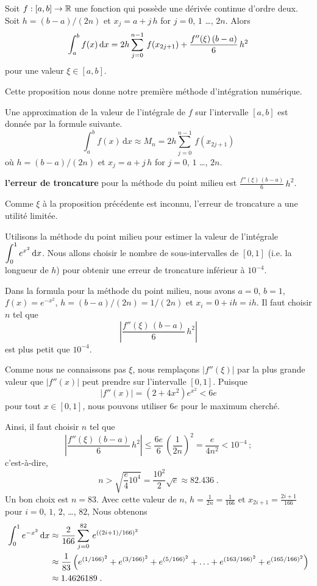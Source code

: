 {\begin{prop}
Soit $f:[a,b]\rightarrow \mathbb{R}$ une fonction qui possède une dérivée
continue d'ordre deux.  Soit $h=(b-a)/(2n)$ et $x_j = a+j\,h$ for
$j=0$, $1$ \ldots, $2n$.  Alors
\[
\int_{a}^{b} f(x)\,\mathrm{d}x = 2h \sum_{j=0}^{n-1}\,f(x_{2j+1}) +
\frac{f''(\xi)\,(b-a)}{6}\,h^2
\]
pour une valeur $\xi \in [a,b]$.
\end{prop}

Cette proposition nous donne notre première méthode d'intégration
numérique.

\begin{meth}
Une approximation de la valeur de l'intégrale de $f$ sur l'intervalle
$[a,b]$ est donnée par la formule suivante.
\[
\int_{a}^{b} f(x)\,\text{d}x \approx M_n = 2h \sum_{j=0}^{n-1}\,f(x_{2j+1})
\]
où $h=(b-a)/(2n)$ et $x_j = a+j\,h$ for $j=0$, $1$ \ldots, $2n$.

{\bfseries l'erreur de troncature} pour la
méthode du point milieu est
$\displaystyle \frac{f''(\xi)\,(b-a)}{6}\,h^2$.
\label{CMR}
\end{meth}

Comme $\xi$ à la proposition précédente est inconnu, l'erreur de
troncature a une utilité limitée.

\begin{egg}
Utilisons la méthode du point milieu pour estimer la valeur de
l'intégrale $\displaystyle \int_0^1 e^{x^2}\,\mathrm{d}x$.  Nous allons
choisir le nombre de sous-intervalles de $[0,1]$ (i.e. la longueur de
$h$) pour obtenir une erreur de troncature inférieur à $10^{-4}$.

Dans la formula pour la méthode du point milieu, nous avons $a=0$, $b=1$,
$f(x) = e^{-x^2}$, $h= (b-a)/(2n) = 1/(2n)$ et $x_i = 0 +i h = ih$.
Il faut choisir $n$ tel que
\[
\left| \frac{f''(\xi)\,(b-a)}{6}\,h^2 \right|
\]
est plus petit que $10^{-4}$.

Comme nous ne connaissons pas $\xi$, nous remplaçons $|f''(\xi)|$ par
la plus grande valeur que $|f''(x)|$ peut prendre sur l'intervalle $[0,1]$.
Puisque
\[
|f''(x)| = (2+4x^2)e^{x^2} < 6e
\]
pour tout $x\in [0,1]$, nous pouvons utiliser $6e$ pour le maximum cherché.

Ainsi, il faut choisir $n$ tel que
\[
\left| \frac{f''(\xi)\,(b-a)}{6}\,h^2 \right|
\leq \frac{6e}{6}\, \left(\frac{1}{2n}\right)^2 
= \frac{e}{4n^2} < 10^{-4} \, ;
\]
c'est-à-dire,
\[
n > \sqrt{ \frac{e}{4} 10^4} = \frac{10^2}{2} \sqrt{e} \approx 82.436 \; .
\]
Un bon choix est $n=83$.  Avec cette valeur de $n$,
$\displaystyle h = \frac{1}{2n} = \frac{1}{166}$ et
$\displaystyle x_{2i+1} = \frac{2i+1}{166}$ pour $i=0$, $1$, $2$, \ldots, $82$,
Nous obtenons
\begin{align*}
\int_0^1 e^{-x^2}\,\mathrm{d}x & \approx \frac{2}{166} \sum_{j=0}^{82}\,
e^{((2i+1)/166)^2} \\
&\approx \frac{1}{83} \left( e^{(1/166)^2} + e^{(3/166)^2} +
e^{(5/166)^2} + \ldots + e^{(163/166)^2} + e^{(165/166)^2}\right) \\
&\approx 1.4626189 \; .
\end{align*}
\end{egg}

}
